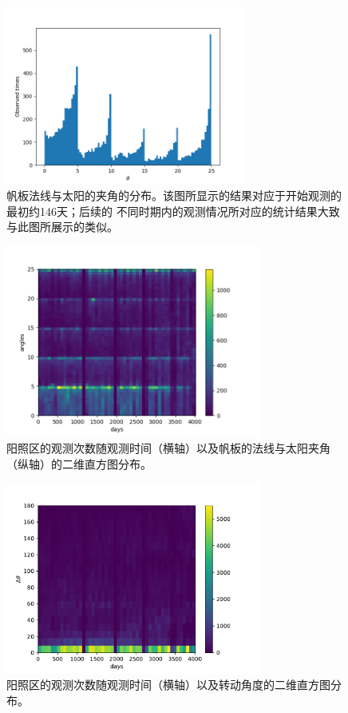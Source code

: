 \begin{figure}
\centering
\includegraphics[width=0.7\textwidth]{figs/check_log/fig_0.png}
\caption{帆板法线与太阳的夹角的分布。该图所显示的结果对应于开始观测的最初约146天；后续的
不同时期内的观测情况所对应的统计结果大致与此图所展示的类似。}
\label{0321_hist1d}
\end{figure}

\begin{figure}
\centering
\includegraphics[width=0.75\textwidth]{figs/check_log/time_angle_hist2d.png}
\caption{阳照区的观测次数随观测时间（横轴）以及帆板的法线与太阳夹角（纵轴）的二维直方图分布。}
\label{0321_hist2d_A}
\end{figure}


\begin{figure}
\centering
\includegraphics[width=0.75\textwidth]{figs/check_log/time_trans_angle}
\caption{阳照区的观测次数随观测时间（横轴）以及转动角度的二维直方图分布。}
\label{0321_hist2d_B}
\end{figure}

